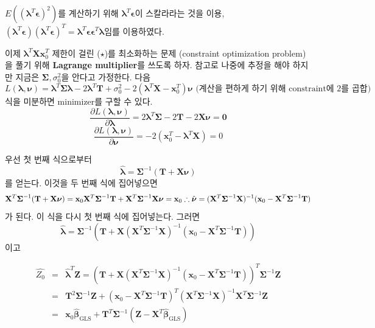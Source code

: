 \documentclass[b5paper,]{book}
\theoremstyle{definition}
\theoremstyle{definition}
\theoremstyle{definition}
\theoremstyle{remark}
\begin{document}
\(E((\boldsymbol{\lambda}^{T}\boldsymbol{\epsilon})^{2})\)를 계산하기
위해 \(\boldsymbol{\lambda}^{T}\boldsymbol{\epsilon}\)이 스칼라라는 것을
이용,
\((\boldsymbol{\lambda}^{T}\boldsymbol{\epsilon})(\boldsymbol{\lambda}^{T}\boldsymbol{\epsilon})^{T}=\boldsymbol{\lambda}^{T}\boldsymbol{\epsilon}\boldsymbol{\epsilon}^{T}\boldsymbol{\lambda}\)임를
이용하였다.

이제 \(\boldsymbol{\lambda}^{T}\mathbf{X}\mathbf{x}_{0}^{T}\) 제한이
걸린 (\(\star\))를 최소화하는 문제 (constraint optimization problem)을
풀기 위해 \textbf{Lagrange multiplier}를 쓰도록 하자. 참고로 나중에
추정을 해야 하지만 지금은 \(\boldsymbol{\Sigma}, \sigma_{0}^{2}\)을
안다고 가정한다. 다음 \[
L(\boldsymbol{\lambda},\boldsymbol{\nu})=\boldsymbol{\lambda}^{T}\boldsymbol{\Sigma}\boldsymbol{\lambda}-2\boldsymbol{\lambda}^{T}\mathbf{T}+\sigma_{0}^{2}-2(\boldsymbol{\lambda}^{T}\mathbf{X}-\mathbf{x}_{0}^{T})\boldsymbol{\nu} \text{ (계산을 편하게 하기 위해 constraint에 2를 곱합)}
\] 식을 미분하면 minimizer를 구할 수 있다.
\[\frac{\partial L(\boldsymbol{\lambda},\boldsymbol{\nu})}{\partial \boldsymbol{\lambda}}=2\boldsymbol{\lambda}^{T}\boldsymbol{\Sigma}-2\mathbf{T}-2\mathbf{X}\boldsymbol{\nu}=\mathbf{0}\]
\[\frac{\partial L(\boldsymbol{\lambda},\boldsymbol{\nu})}{\partial \boldsymbol{\nu}}=-2(\mathbf{x}_{0}^{T}-\boldsymbol{\lambda}^{T}\mathbf{X})=0 \]

우선 첫 번째 식으로부터
\[\hat{\boldsymbol{\lambda}}=\boldsymbol{\Sigma}^{-1}(\mathbf{T}+\mathbf{X}\boldsymbol{\nu})\]
를 얻는다. 이것을 두 번째 식에 집어넣으면 \[
\mathbf{X}^{T}\boldsymbol{\Sigma}^{-1}(\mathbf{T}+\mathbf{X}\boldsymbol{\nu})=\mathbf{x}_{0}\\
\mathbf{X}^{T}\boldsymbol{\Sigma}^{-1}\mathbf{T}+\mathbf{X}^{T}\boldsymbol{\Sigma}^{-1}\mathbf{X}\boldsymbol{\nu}=\mathbf{x}_{0}\\
\therefore \hat{\boldsymbol{\nu}}=(\mathbf{X}^{T}\boldsymbol{\Sigma}^{-1}\mathbf{X})^{-1}(\mathbf{x}_{0}-\mathbf{X}^{T}\boldsymbol{\Sigma}^{-1}\mathbf{T})\\
\] 가 된다. 이 식을 다시 첫 번째 식에 집어넣는다. 그러면
\[\hat{\boldsymbol{\lambda}}=\boldsymbol{\Sigma}^{-1}(\mathbf{T}+\mathbf{X}(\mathbf{X}^{T}\boldsymbol{\Sigma}^{-1}\mathbf{X})^{-1}(\mathbf{x}_{0}-\mathbf{X}^{T}\boldsymbol{\Sigma}^{-1}\mathbf{T}))\]
이고

\begin{eqnarray*}
\hat{Z_{0}}&=&\hat{\boldsymbol{\lambda}}^{T}\mathbf{Z}=(\mathbf{T}+\mathbf{X}(\mathbf{X}^{T}\boldsymbol{\Sigma}^{-1}\mathbf{X})^{-1}(\mathbf{x}_{0}-\mathbf{X}^{T}\boldsymbol{\Sigma}^{-1}\mathbf{T}))^{T}\boldsymbol{\Sigma}^{-1}\mathbf{Z}\\
&=&\mathbf{T}^{2}\boldsymbol{\Sigma}^{-1}\mathbf{Z}+(\mathbf{x}_{0}-\mathbf{X}^{T}\boldsymbol{\Sigma}^{-1}\mathbf{T})^{T}(\mathbf{X}^{T}\boldsymbol{\Sigma}^{-1}\mathbf{X})^{-1}\mathbf{X}^{T}\boldsymbol{\Sigma}^{-1}\mathbf{Z}\\
&=&\mathbf{x}_{0}\hat{\boldsymbol{\beta}}_{\text{GLS}}+\mathbf{T}^{T}\boldsymbol{\Sigma}^{-1}(\mathbf{Z}-\mathbf{X}^{T}\hat{\boldsymbol{\beta}}_{\text{GLS}})\\
\end{eqnarray*}
\end{document}
